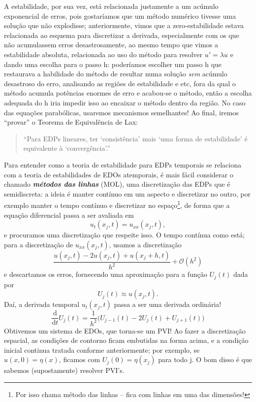 \documentclass[../differential_methods.tex]{subfiles}
\begin{document}
A estabilidade, por sua vez, está relacionada justamente a um acúmulo exponencial de erros, pois gostaríamos que um método numérico tivesse uma solução que não explodisse; anteriormente, vimos que a zero-estabilidade estava relacionada ao esquema para discretizar a derivada, especialmente com os que não acumulassem erros desastrosamente, ao mesmo tempo que vimos a estabilidade absoluta, relacionada ao uso do método para resolver \(u'=\lambda u\) e dando uma escolha para o passo h: poderíamos escolher um passo h que restaurava a habilidade do método de resultar numa solução \textit{sem} acúmulo desastroso do erro, analisando as regiões de estabilidade e etc, fora da qual o método acumula potências enormes de erro e acabou-se o método, então a escolha adequada do h iria impedir isso ao encaixar o método dentro da região.
No caso das equações parabólicas, usaremos mecanismos semelhantes! Ao final, iremos ``provar'' o Teorema de Equivalência de Lax:
\begin{quote}
	``Para EDPs lineares, ter `consistência' mais `uma forma de estabilidade' é equivalente à `convergência'.''
\end{quote}

Para entender como a teoria de estabilidade para EDPs temporais se relaciona com a teoria de estabilidades de EDOs atemporais, é mais fácil considerar o chamado \textit{\textbf{métodos das linhas}} (MOL), uma discretização das EDPs que é semidiscreta: a ideia é manter contínuo em um aspecto e discretizar no outro, por exemplo manter o tempo contínuo e discretizar no espaço\footnote{Por isso chama método das linhas -- fica com linhas em uma das dimensões!}, de forma que a equação diferencial passa a ser avaliada em
\[
	u_t(x_{j}, t) = u_{xx}(x_{j}, t),
\]
e procuramos uma discretização que respeite isso. O tempo contínua como está; para a discretização de \(u_{xx}(x_{j}, t)\), usamos a discretização
\[
	\frac{u(x_{j}, t) - 2u(x_{j}, t) + u(x_{j}+h, t)}{h^{2}} + \mathcal{O}(h^{2})
\]
e descartamos os erros, fornecendo uma aproximação para a função \(U_{j}(t)\) dada por
\[
	U_{j}(t)\approx u(x_{j}, t).
\]
Daí, a derivada temporal \(u_{t}(x_{j}, t)\) passa a ser uma derivada ordinária!
\[
	\boxed{\frac{\mathrm{d}}{\mathrm{d}t}U_{j}(t) = \frac{1}{h^{2}}\biggl(U_{j-1}(t) - 2U_{j}(t) + U_{j+1}(t)\biggr)}
\]
Obtivemos um sistema de EDOs, que torna-se um PVI! Ao fazer a discretização espacial, as condições de contorno ficam embutidas na forma acima, e a condição inicial continua tratada conforme anteriormente; por exemplo, se \(u(x, 0) = \eta (x)\), ficamos com \(U_{j}(0) = \eta (x_{j})\) para todo j.
O bom disso é que sabemos (supostamente) resolver PVI's.
\end{document}
